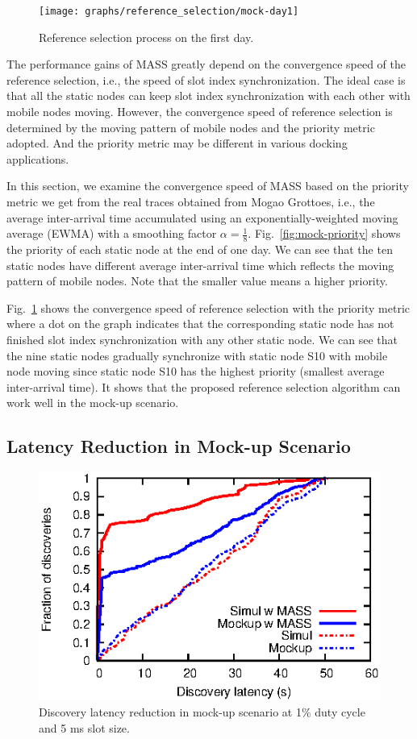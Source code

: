 \documentclass[twoside,twocolumn]{article}
\begin{document}
\begin{figure}[t]
   \centering
   \texttt{[image: graphs/reference\_selection/mock-day1]}
   \caption{Reference selection process on the first day.}
   \label{fig:mock-day1}
\end{figure}

The performance gains of MASS greatly depend on the convergence speed of the reference
selection, i.e., the speed of slot index synchronization. The ideal case is that all the
static nodes can keep slot index synchronization with each other with mobile nodes moving.
However, the convergence speed of reference selection is determined by the moving pattern
of mobile nodes and the priority metric adopted. And the priority metric may be different
in various docking applications.

In this section, we examine the convergence speed of MASS based on the priority metric we
get from the real traces obtained from Mogao Grottoes, i.e., the average inter-arrival time
accumulated using an exponentially-weighted moving average (EWMA) with a smoothing factor 
$\alpha = \frac{1}{8}$. Fig.~\ref{fig:mock-priority} shows the priority of each static node
at the end of one day. We can see that the ten static nodes have different average 
inter-arrival time which reflects the moving pattern of mobile nodes. Note that the smaller
value means a higher priority.

Fig.~\ref{fig:mock-day1} shows the convergence speed of reference selection with the priority
metric where a dot on the graph indicates that the corresponding static node has not finished
slot index synchronization with any other static node. We can see that the nine static nodes
gradually synchronize with static node S10 with mobile node moving since static node S10 has
the highest priority (smallest average inter-arrival time). It shows that the proposed reference
selection algorithm can work well in the mock-up scenario.

\subsection{Latency Reduction in Mock-up Scenario}

\begin{figure}[t]
   \centering
   \includegraphics{graphs/latency-mockup/latency-reduction}
   \caption{Discovery latency reduction in mock-up scenario at 1\% duty cycle and 5 ms slot size.}
   \label{fig:latency-reduction}
\end{figure}
\end{document}
